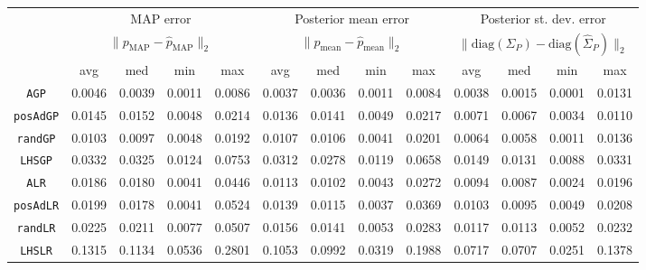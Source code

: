 \begin{table}[H]

    \begin{centering}
        
    \hspace*{-1.5cm}
    \begin{tabular}{ccccccccccccc}
    \toprule
        & \multicolumn{4}{c}{MAP error}  & \multicolumn{4}{c}{Posterior mean error} & \multicolumn{4}{c}{Posterior st. dev. error} \\ 
        & \multicolumn{4}{c}{$ \|p_\text{MAP} - \hat p _\text{MAP}\|_2 $}  & \multicolumn{4}{c}{$ \|p_\text{mean} - \hat p _\text{mean}\|_2 $} & \multicolumn{4}{c}{$\| \text{diag}(\Sigma_P) - \text{diag}( \hat \Sigma _P) \|_2$} \\ 
        & avg   & med   & min   & max   & avg   & med   & min   & max   & avg   & med   & min   & max \\
        \midrule
        \texttt{AGP}
        & 0.0046 & 0.0039 & 0.0011 & 0.0086
        & 0.0037 & 0.0036 & 0.0011 & 0.0084
        & 0.0038 & 0.0015 & 0.0001 & 0.0131 \\
        \texttt{posAdGP}
        & 0.0145 & 0.0152 & 0.0048 & 0.0214 
        & 0.0136 & 0.0141 & 0.0049 & 0.0217
        & 0.0071 & 0.0067 & 0.0034 & 0.0110 \\
        \texttt{randGP}
        & 0.0103 & 0.0097 & 0.0048 & 0.0192 
        & 0.0107 & 0.0106 & 0.0041 & 0.0201
        & 0.0064 & 0.0058 & 0.0011 & 0.0136 \\
        \texttt{LHSGP}
        & 0.0332 & 0.0325 & 0.0124 & 0.0753 
        & 0.0312 & 0.0278 & 0.0119 & 0.0658
        & 0.0149 & 0.0131 & 0.0088 & 0.0331 \\
        \texttt{ALR}
        & 0.0186 & 0.0180 & 0.0041 & 0.0446
        & 0.0113 & 0.0102 & 0.0043 & 0.0272
        & 0.0094 & 0.0087 & 0.0024 & 0.0196 \\
        \texttt{posAdLR}
        & 0.0199 & 0.0178 & 0.0041 & 0.0524
        & 0.0139 & 0.0115 & 0.0037 & 0.0369
        & 0.0103 & 0.0095 & 0.0049 & 0.0208 \\
        \texttt{randLR}
        & 0.0225 & 0.0211 & 0.0077 & 0.0507
        & 0.0156 & 0.0141 & 0.0053 & 0.0283
        & 0.0117 & 0.0113 & 0.0052 & 0.0232 \\
        \texttt{LHSLR}
        & 0.1315 & 0.1134 & 0.0536 & 0.2801 
        & 0.1053 & 0.0992 & 0.0319 & 0.1988
        & 0.0717 & 0.0707 & 0.0251 & 0.1378 \\
        

\end{tabular}
\end{centering}
\end{table}
